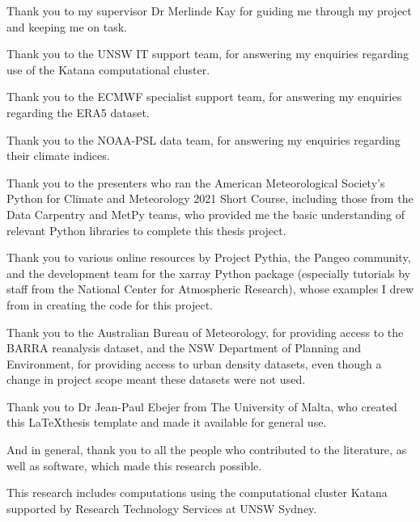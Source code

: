 \begin{acknowledgements}

Thank you to my supervisor Dr Merlinde Kay for guiding me through my project and keeping me on task. 

Thank you to the UNSW IT support team, for answering my enquiries regarding use of the Katana computational cluster.

Thank you to the ECMWF specialist support team, for answering my enquiries regarding the ERA5 dataset.

Thank you to the NOAA-PSL data team, for answering my enquiries regarding their climate indices.

Thank you to the presenters who ran the American Meteorological Society's Python for Climate and Meteorology 2021 Short Course, including those from the Data Carpentry and MetPy teams, who provided me the basic understanding of relevant Python libraries to complete this thesis project. 

Thank you to various online resources by Project Pythia, the Pangeo community, and the development team for the xarray Python package (especially tutorials by staff from the National Center for Atmospheric Research), whose examples I drew from in creating the code for this project. 

Thank you to the Australian Bureau of Meteorology, for providing access to the BARRA reanalysis dataset, and the NSW Department of Planning and Environment, for providing access to urban density datasets, even though a change in project scope meant these datasets were not used.

Thank you to Dr Jean-Paul Ebejer from The University of Malta, who created this \LaTeX thesis template and made it available for general use.

And in general, thank you to all the people who contributed to the literature, as well as software, which made this research possible.

This research includes computations using the computational cluster Katana supported by Research Technology Services at UNSW Sydney.
\end{acknowledgements}